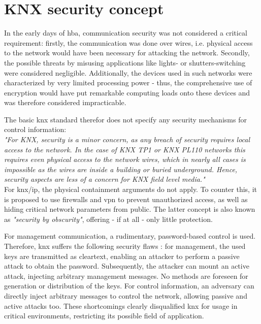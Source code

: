\section{KNX security concept}

In the early days of \gls{hba}, communication security was not considered a critical requirement: firstly, the communication was done over wires,
i.e. physical access to the network would have been necessary for attacking the network. Secondly, the possible threats by misusing applications like
lights- or shutters-switching were considered
negligible. Additionally, the devices used in such networks were characterized by very limited processing power - thus, the comprehensive use of encryption would
have put remarkable computing loads onto these devices and was therefore considered impracticable. 

The basic \gls{knx} standard therefor does not specify any security mechanisms for control information:
\\

\textit{"For KNX, security is a minor concern, as any breach of security requires local access to the network. 
In the case of KNX TP1 or KNX PL110 networks this requires even physical access to the network wires,
which in nearly all cases is impossible as the wires are inside a building or buried underground.
Hence, security aspects are less of a concern for KNX field level media."} \cite{knxSpec}
\\

For \gls{knx}/\gls{ip}, the physical containment arguments do not apply. To counter this, it is proposed to use firewalls and \gls{vpn} to prevent unauthorized access,
as well as hiding critical network parameters from public. The latter concept is also known as \textit{"security by obscurity"}, offering - if at all - only 
little protection.

For management communication, a rudimentary, password-based control is used. Therefore, \gls{knx} suffers the following security flaws 
\cite{Granzer05securityin}: for management, the 
used keys are transmitted as cleartext, enabling an attacker to perform a passive attack to obtain the password. Subsequently, the attacker can mount an active
attack, injecting
arbitrary management messages. No methods are foreseen for generation or distribution of the keys.
For control information, an adversary can directly inject arbitrary messages to control the network, allowing passive and active attacks too.
These shortcomings clearly disqualified \gls{knx} for usage in critical environments, restricting its possible field of application.


